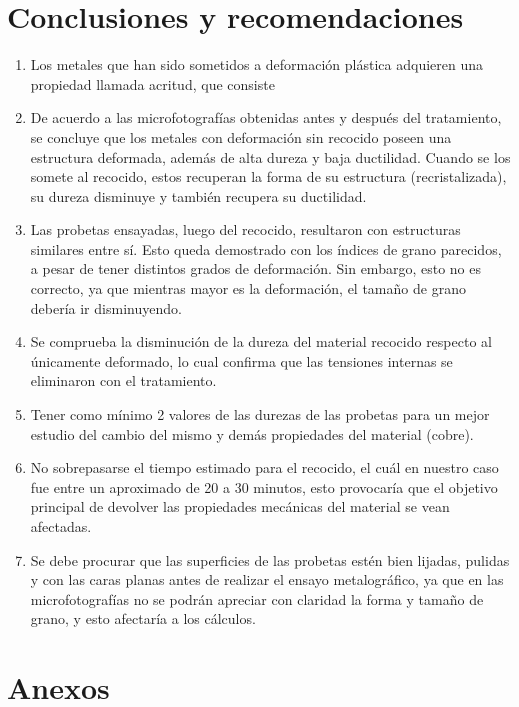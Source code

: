 \documentclass[a4paper,12pt]{report}
\begin{document}
\chapter{Conclusiones y recomendaciones}
\begin{enumerate}
\item Los metales que han sido sometidos a deformación plástica adquieren una propiedad llamada acritud, que consiste %
\item De acuerdo a las microfotografías obtenidas antes y después del tratamiento, se concluye que los metales con deformación sin recocido poseen una estructura deformada, además de alta dureza y baja ductilidad. Cuando se los somete al recocido, estos recuperan la forma de su estructura (recristalizada), su dureza disminuye y también recupera su ductilidad.
\item Las probetas ensayadas, luego del recocido, resultaron con estructuras similares entre sí. Esto queda demostrado con los índices de grano parecidos, a pesar de tener distintos grados de deformación. Sin embargo, esto no es correcto, ya que mientras mayor es la deformación, el tamaño de grano debería ir disminuyendo.
\item Se comprueba la disminución de la dureza del material recocido respecto al únicamente deformado, lo cual confirma que las tensiones internas se eliminaron con el tratamiento.
\item Tener como mínimo 2 valores de las durezas de las probetas para un mejor estudio del cambio del mismo y demás propiedades del material (cobre).
\item No sobrepasarse el tiempo estimado para el recocido, el cuál en nuestro caso fue entre un aproximado de 20 a 30 minutos, esto provocaría que el objetivo principal de devolver las propiedades mecánicas del material se vean afectadas.
\item Se debe procurar que las superficies de las probetas estén bien lijadas, pulidas y con las caras planas antes de realizar el ensayo metalográfico, ya que en las microfotografías no se podrán apreciar con claridad la forma y tamaño de grano, y esto afectaría a los cálculos. 
\end{enumerate}
\chapter{Anexos}
\end{document}
